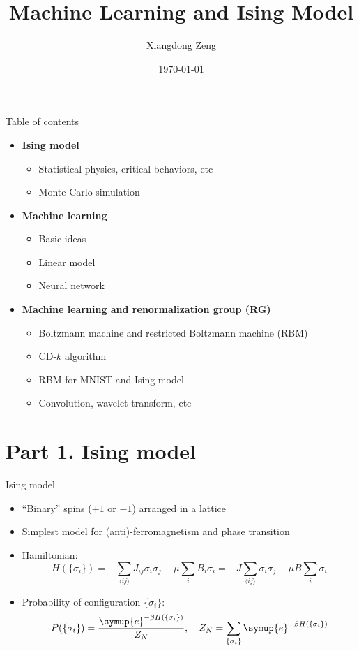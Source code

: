 \documentclass[aspectratio=169]{beamer}
\title{Machine Learning and Ising Model}
\date{\today}
\author{Xiangdong Zeng}
\institute{Department of Physics, Fudan University}
\def\ee{{\symup{e}}}
\def\nearest#1{\langle#1\rangle}
\def\q#1{{\{#1\}}}
\def\CDk{CD-$k$}
\begin{document}
\maketitle

\iffalse
\begin{frame}{Table of contents}
\begin{itemize}
  \item \textbf{Ising model}
    \begin{itemize}
      \item Statistical physics, critical behaviors, etc
      \item Monte Carlo simulation
    \end{itemize}
  \item \textbf{Machine learning}
    \begin{itemize}
      \item Basic ideas
      \item Linear model
      \item Neural network
    \end{itemize}
  \item \textbf{Machine learning and renormalization group (RG)}
    \begin{itemize}
      \item Boltzmann machine and restricted Boltzmann machine (RBM)
      \item \CDk{} algorithm
      \item RBM for MNIST and Ising model
      \item Convolution, wavelet transform, etc
    \end{itemize}
\end{itemize}
\end{frame}

\section{Part 1. Ising model}

\begin{frame}{Ising model}
\begin{itemize}
  \item ``Binary'' spins ($+1$ or $-1$) arranged in a lattice
  \item Simplest model for (anti)-ferromagnetism and phase transition
  \item Hamiltonian:
    \[
      H(\q{\sigma_i}) = -\sum_{\nearest{ij}} J_{ij}\sigma_i\sigma_j - \mu \sum_{i} B_i\sigma_i
                      = -J \sum_{\nearest{ij}} \sigma_i\sigma_j - \mu B \sum_{i} \sigma_i
    \]
  \item Probability of configuration $\q{\sigma_i}$:
    \[
      P(\q{\sigma_i}) = \frac{\ee^{-\beta H(\q{\sigma_i})}}{Z_N} \qc
      Z_N = \sum_\q{\sigma_i} \ee^{-\beta H(\q{\sigma_i})}
    \]
\end{itemize}
\end{frame}
\end{document}

